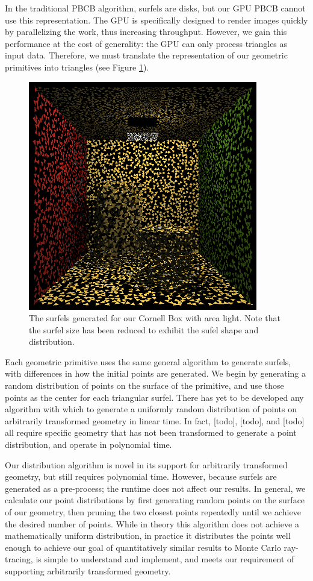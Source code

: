 In the traditional PBCB algorithm, surfels are disks, but our GPU PBCB cannot use this representation. The GPU is specifically designed to render images quickly by parallelizing the work, thus increasing throughput. However, we gain this performance at the cost of generality: the GPU can only process triangles as input data. Therefore, we must translate the representation of our geometric primitives into triangles (see Figure \ref{fig:surfelcloud}).

\begin{figure}[h!]
   \centering
   \includegraphics[width=100mm]{../img/cornell_simp_area_surfelcloud.png}
   \captionfonts
   \caption[Cornell Box with area light surfels]{The surfels generated for our Cornell Box with area light. Note that the surfel size has been reduced to exhibit the sufel shape and distribution.}
   \label{fig:surfelcloud}
\end{figure}

Each geometric primitive uses the same general algorithm to generate surfels, with differences in how the initial points are generated. We begin by generating a random distribution of points on the surface of the primitive, and use those points as the center for each triangular surfel. There has yet to be developed any algorithm with which to generate a uniformly random distribution of points on arbitrarily transformed geometry in linear time. In fact, [todo], [todo], and [todo] all require specific geometry that has not been transformed to generate a point distribution, and operate in polynomial time.

Our distribution algorithm is novel in its support for arbitrarily transformed geometry, but still requires polynomial time. However, because surfels are generated as a pre-process; the runtime does not affect our results. In general, we calculate our point distributions by first generating random points on the surface of our geometry, then pruning the two closest points repeatedly until we achieve the desired number of points. While in theory this algorithm does not achieve a mathematically uniform distribution, in practice it distributes the points well enough to achieve our goal of quantitatively similar results to Monte Carlo ray-tracing, is simple to understand and implement, and meets our requirement of supporting arbitrarily transformed geometry.

